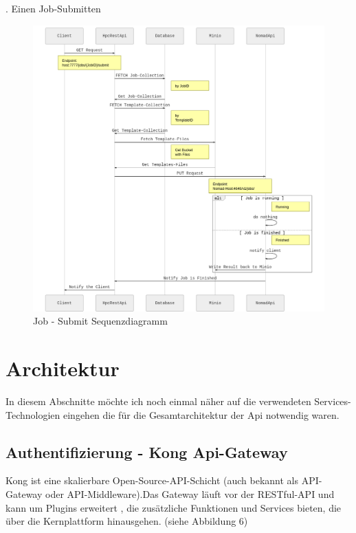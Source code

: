 \documentclass[12pt]{article}
\begin{document}
. Einen Job-Submitten
\begin{figure}[h!]
  \centering

  \includegraphics[width=\textwidth]{images/jobsubmit.png}
  \caption{Job - Submit Sequenzdiagramm }
  \label{}

\end{figure}





\newpage

\section{Architektur}

In diesem Abschnitte möchte ich noch einmal näher auf die verwendeten Services-Technologien eingehen die für die Gesamtarchitektur der Api notwendig waren.

\subsection{Authentifizierung - Kong Api-Gateway \cite{KONGAPI}}

Kong ist eine skalierbare Open-Source-API-Schicht (auch bekannt als API-Gateway oder API-Middleware).Das Gateway läuft vor der RESTful-API und kann um Plugins erweitert , die zusätzliche Funktionen und Services bieten, die über die Kernplattform hinausgehen. (siehe Abbildung 6)
\end{document}
